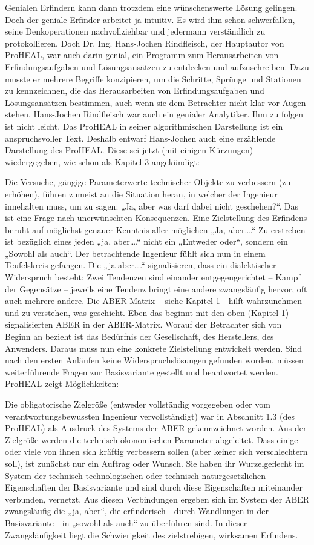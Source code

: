 \documentclass[12pt,a4paper]{article}
\begin{document}
Genialen Erfindern kann dann trotzdem eine wünschenswerte Lösung gelingen. Doch der geniale Erfinder arbeitet ja intuitiv. Es wird ihm schon schwerfallen, seine Denkoperationen nachvollziehbar und jedermann verständlich zu protokollieren. Doch Dr. Ing. Hans-Jochen Rindfleisch, der Hauptautor von ProHEAL, war auch darin genial, ein Programm zum Herausarbeiten von Erfindungsaufgaben und Lösungsansätzen zu entdecken und aufzuschreiben. Dazu musste er mehrere Begriffe konzipieren, um die Schritte, Sprünge und Stationen zu kennzeichnen, die das Herausarbeiten von Erfindungsaufgaben und Lösungsansätzen bestimmen, auch wenn sie dem Betrachter nicht klar vor Augen stehen. Hans-Jochen Rindfleisch war auch ein genialer Analytiker. Ihm zu folgen ist nicht leicht. Das ProHEAL in seiner algorithmischen Darstellung ist ein anspruchsvoller Text. Deshalb entwarf Hans-Jochen auch eine erzählende Darstellung des ProHEAL. Diese sei jetzt (mit einigen Kürzungen) wiedergegeben, wie schon als Kapitel 3 angekündigt:

Die Versuche, gängige Parameterwerte technischer Objekte zu verbessern (zu erhöhen), führen zumeist an die Situation heran, in welcher der Ingenieur innehalten muss, um zu sagen: „Ja, aber was darf dabei nicht geschehen?“. Das ist eine Frage nach unerwünschten Konsequenzen. Eine Zielstellung des Erfindens beruht auf möglichst genauer Kenntnis aller möglichen „Ja, aber….“ Zu erstreben ist bezüglich eines jeden „ja, aber….“ nicht ein „Entweder oder“, sondern ein „Sowohl als auch“. Der betrachtende Ingenieur fühlt sich nun in einem Teufelskreis gefangen. Die „ja aber….“ signalisieren, dass ein dialektischer Widerspruch besteht: Zwei Tendenzen sind einander entgegengerichtet – Kampf der Gegensätze – jeweils eine Tendenz bringt eine andere zwangsläufig hervor, oft auch mehrere andere. Die ABER-Matrix – siehe Kapitel 1 - hilft wahrzunehmen und zu verstehen, was geschieht. Eben das beginnt mit den oben (Kapitel 1) signalisierten ABER in der ABER-Matrix. Worauf der Betrachter sich von Beginn an bezieht ist das Bedürfnis der Gesellschaft, des Herstellers, des Anwenders. Daraus muss nun eine konkrete Zielstellung entwickelt werden. Sind nach den ersten Anläufen keine Widerspruchslösungen gefunden worden, müssen weiterführende Fragen zur Basisvariante gestellt und beantwortet werden. ProHEAL zeigt Möglichkeiten:

Die obligatorische Zielgröße (entweder vollständig vorgegeben oder vom verantwortungsbewussten Ingenieur vervollständigt) war in Abschnitt 1.3 (des ProHEAL) als Ausdruck des Systems der ABER gekennzeichnet worden. Aus der Zielgröße werden die technisch-ökonomischen Parameter abgeleitet. Dass einige oder viele von ihnen sich kräftig verbessern sollen (aber keiner sich verschlechtern soll), ist zunächst nur ein Auftrag oder Wunsch. Sie haben ihr Wurzelgeflecht im System der technisch-technologischen oder technisch-naturgesetzlichen Eigenschaften der Basisvariante und sind durch diese Eigenschaften miteinander verbunden, vernetzt. Aus diesen Verbindungen ergeben sich im System der ABER zwangsläufig die „ja, aber“, die erfinderisch - durch Wandlungen in der Basisvariante - in „sowohl als auch“ zu überführen sind. In dieser Zwangsläufigkeit liegt die Schwierigkeit des zielstrebigen, wirksamen Erfindens.
\end{document}
